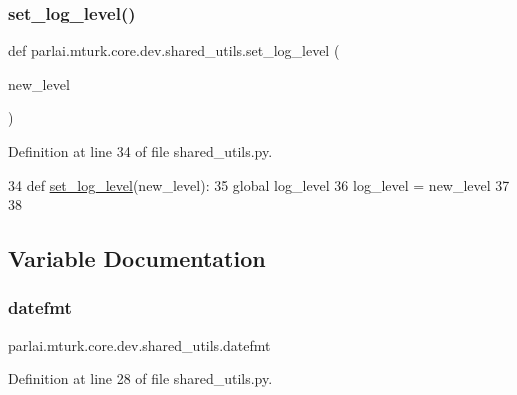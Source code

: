 \subsubsection{\texorpdfstring{set\+\_\+log\+\_\+level()}{set\_log\_level()}}
{\footnotesize\ttfamily def parlai.\+mturk.\+core.\+dev.\+shared\+\_\+utils.\+set\+\_\+log\+\_\+level (\begin{DoxyParamCaption}\item[{}]{new\+\_\+level }\end{DoxyParamCaption})}



Definition at line 34 of file shared\+\_\+utils.\+py.


\begin{DoxyCode}
34 \textcolor{keyword}{def }\hyperlink{namespaceparlai_1_1mturk_1_1core_1_1shared__utils_ac8a4f9a9107ed8eca14da5117922fbee}{set\_log\_level}(new\_level):
35     \textcolor{keyword}{global} log\_level
36     log\_level = new\_level
37 
38 
\end{DoxyCode}


\subsection{Variable Documentation}
\mbox{\label{namespaceparlai_1_1mturk_1_1core_1_1dev_1_1shared__utils_a83336eaa896a5b3f6ea12720e511e7f7}} 
\subsubsection{\texorpdfstring{datefmt}{datefmt}}
{\footnotesize\ttfamily parlai.\+mturk.\+core.\+dev.\+shared\+\_\+utils.\+datefmt}



Definition at line 28 of file shared\+\_\+utils.\+py.

\mbox{\label{namespaceparlai_1_1mturk_1_1core_1_1dev_1_1shared__utils_a34057453b7480c688a7b07dae765b56b}} 
